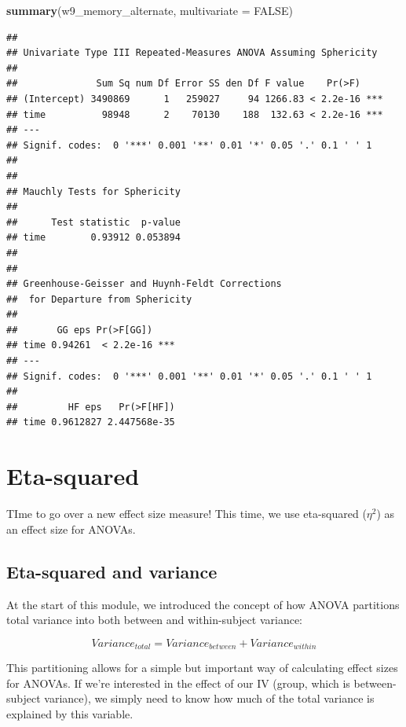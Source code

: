\documentclass[
]{book}
\newenvironment{Shaded}{\begin{snugshade}}{\end{snugshade}}
\newcommand{\AttributeTok}[1]{\textcolor[rgb]{0.13,0.29,0.53}{#1}}
\newcommand{\ConstantTok}[1]{\textcolor[rgb]{0.56,0.35,0.01}{#1}}
\newcommand{\FunctionTok}[1]{\textcolor[rgb]{0.13,0.29,0.53}{\textbf{#1}}}
\newcommand{\NormalTok}[1]{#1}
\begin{document}
\begin{Shaded}
\begin{Highlighting}[]
\FunctionTok{summary}\NormalTok{(w9\_memory\_alternate, }\AttributeTok{multivariate =} \ConstantTok{FALSE}\NormalTok{)}
\end{Highlighting}
\end{Shaded}

\begin{verbatim}
## 
## Univariate Type III Repeated-Measures ANOVA Assuming Sphericity
## 
##              Sum Sq num Df Error SS den Df F value    Pr(>F)    
## (Intercept) 3490869      1   259027     94 1266.83 < 2.2e-16 ***
## time          98948      2    70130    188  132.63 < 2.2e-16 ***
## ---
## Signif. codes:  0 '***' 0.001 '**' 0.01 '*' 0.05 '.' 0.1 ' ' 1
## 
## 
## Mauchly Tests for Sphericity
## 
##      Test statistic  p-value
## time        0.93912 0.053894
## 
## 
## Greenhouse-Geisser and Huynh-Feldt Corrections
##  for Departure from Sphericity
## 
##       GG eps Pr(>F[GG])    
## time 0.94261  < 2.2e-16 ***
## ---
## Signif. codes:  0 '***' 0.001 '**' 0.01 '*' 0.05 '.' 0.1 ' ' 1
## 
##         HF eps   Pr(>F[HF])
## time 0.9612827 2.447568e-35
\end{verbatim}

\hypertarget{eta-squared}{%
\section{Eta-squared}\label{eta-squared}}

TIme to go over a new effect size measure! This time, we use eta-squared (\(\eta^2\)) as an effect size for ANOVAs.

\hypertarget{eta-squared-and-variance}{%
\subsection{Eta-squared and variance}\label{eta-squared-and-variance}}

At the start of this module, we introduced the concept of how ANOVA partitions total variance into both between and within-subject variance:

\[
Variance_{total} = Variance_{between} + Variance_{within}
\]

This partitioning allows for a simple but important way of calculating effect sizes for ANOVAs. If we're interested in the effect of our IV (group, which is between-subject variance), we simply need to know how much of the total variance is explained by this variable.
\end{document}

